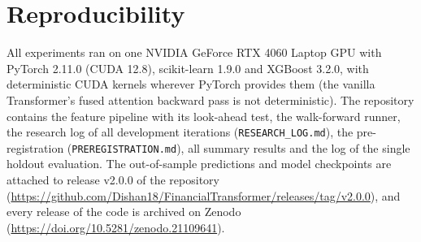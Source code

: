 \documentclass[conference]{IEEEtran}
\begin{document}
\section{Reproducibility}
\label{app:repro}
All experiments ran on one NVIDIA GeForce RTX 4060 Laptop GPU with PyTorch 2.11.0 (CUDA 12.8), scikit-learn 1.9.0 and XGBoost 3.2.0, with deterministic CUDA kernels wherever PyTorch provides them (the vanilla Transformer's fused attention backward pass is not deterministic). The repository contains the feature pipeline with its look-ahead test, the walk-forward runner, the research log of all development iterations (\texttt{RESEARCH\_LOG.md}), the pre-registration (\texttt{PREREGISTRATION.md}), all summary results and the log of the single holdout evaluation. The out-of-sample predictions and model checkpoints are attached to release v2.0.0 of the repository (\url{https://github.com/Dishan18/FinancialTransformer/releases/tag/v2.0.0}), and every release of the code is archived on Zenodo (\url{https://doi.org/10.5281/zenodo.21109641}).


\end{document}
